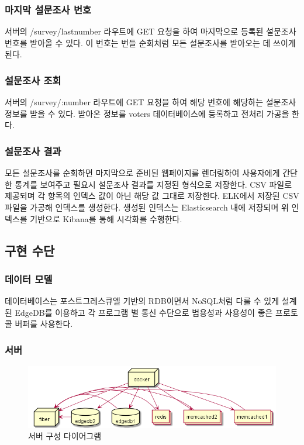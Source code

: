 \documentclass[8pt,a4paper,left=8mm,right=8mm,top=10mm,bottom=10mm]{article}
\begin{document}
    \subsubsection{마지막 설문조사 번호}
    
    서버의 /survey/lastnumber 라우트에 GET 요청을 하여 마지막으로 등록된 설문조사 번호를 받아올 수 있다. 이 번호는 번들 순회처럼 모든 설문조사를 받아오는 데 쓰이게 된다.

    \subsubsection{설문조사 조회}

    서버의 /survey/:number 라우트에 GET 요청을 하여 해당 번호에 해당하는 설문조사 정보를 받을 수 있다. 받아온 정보를 voters 데이터베이스에 등록하고 전처리 가공을 한다.

    \subsubsection{설문조사 결과}

    모든 설문조사를 순회하면 마지막으로 준비된 웹페이지를 렌더링하여 사용자에게 간단한 통계를 보여주고 필요시 설문조사 결과를 지정된 형식으로 저장한다. CSV 파일로 제공되며 각 항목의 인덱스 값이 아닌 해당 값 그대로 저장한다. ELK에서 저장된 CSV 파일을 가공해 인덱스를 생성한다. 생성된 인덱스는 Elasticsearch 내에 저장되며 위 인덱스를 기반으로 Kibana를 통해 시각화를 수행한다.

\subsection{구현 수단}
    \subsubsection{데이터 모델}

    데이터베이스는 포스트그레스큐엘 기반의 RDB이면서 NoSQL처럼 다룰 수 있게 설계된 EdgeDB를 이용하고 각 프로그램 별 통신 수단으로 범용성과 사용성이 좋은 프로토콜 버퍼를 사용한다. 

    \subsubsection{서버}

    \begin{figure}[h]
        \begin{center}
            \includegraphics[width=14cm]{server-method}
            \caption{서버 구성 다이어그램}
        \end{center}
    \end{figure}
\end{document}
